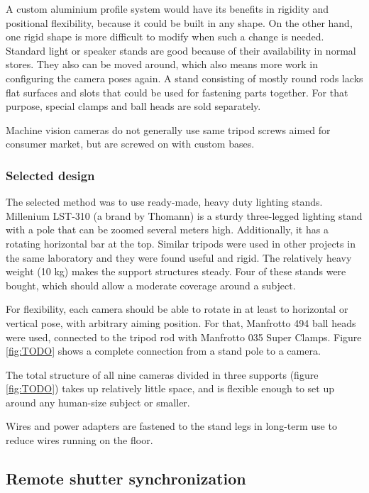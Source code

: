 A custom aluminium profile system would have its benefits in rigidity and positional flexibility, because it could be built in any shape.
On the other hand, one rigid shape is more difficult to modify when such a change is needed.
Standard light or speaker stands are good because of their availability in normal stores.
They also can be moved around, which also means more work in configuring the camera poses again.
A stand consisting of mostly round rods lacks flat surfaces and slots that could be used for fastening parts together.
For that purpose, special clamps and ball heads are sold separately.

Machine vision cameras do not generally use same tripod screws aimed for consumer market, but are screwed on with custom bases.

\subsubsection{Selected design}

The selected method was to use ready-made, heavy duty lighting stands.
Millenium LST-310 (a brand by Thomann) is a sturdy three-legged lighting stand with a pole that can be zoomed several meters high.
Additionally, it has a rotating horizontal bar at the top.
Similar tripods were used in other projects in the same laboratory and they were found useful and rigid.
The relatively heavy weight (10 kg) makes the support structures steady. %
Four of these stands were bought, which should allow a moderate coverage around a subject. %

For flexibility, each camera should be able to rotate in at least to horizontal or vertical pose, with arbitrary aiming position.
For that, Manfrotto 494 ball heads were used, connected to the tripod rod with Manfrotto 035 Super Clamps.
Figure \ref{fig:TODO} shows a complete connection from a stand pole to a camera.

The total structure of all nine cameras divided in three supports (figure \ref{fig:TODO}) takes up relatively little space, and is flexible enough to set up around any human-size subject or smaller.

Wires and power adapters are fastened to the stand legs in long-term use to reduce wires running on the floor.


\subsection{Remote shutter synchronization} %

